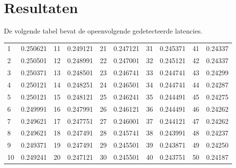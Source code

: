 \section*{Resultaten}
De volgende tabel bevat de opeenvolgende gedetecteerde latencies.
\begin{table}[h!]
	\centering
	\begin{tabular}{l l|l l|l l|l l|l l}
		1 & 0.250621 & 11 & 0.249121 & 21 & 0.247121 & 31 & 0.245371 & 41 & 0.24337 \\
		2 & 0.250501 & 12 & 0.248991 & 22 & 0.247001 & 32 & 0.245121 & 42 & 0.24337 \\
		3 & 0.250371 & 13 & 0.248501 & 23 & 0.246741 & 33 & 0.244741 & 43 & 0.24299 \\
		4 & 0.250121 & 14 & 0.248251 & 24 & 0.246501 & 34 & 0.244741 & 44 & 0.24287 \\
		5 & 0.250121 & 15 & 0.248121 & 25 & 0.246241 & 35 & 0.244491 & 45 & 0.24275 \\
		6 & 0.249991 & 16 & 0.247991 & 26 & 0.246121 & 36 & 0.244491 & 46 & 0.24262 \\
		7 & 0.249621 & 17 & 0.247751 & 27 & 0.246001 & 37 & 0.244121 & 47 & 0.24262 \\
		8 & 0.249621 & 18 & 0.247491 & 28 & 0.245741 & 38 & 0.243991 & 48 & 0.24237 \\
		9 & 0.249371 & 19 & 0.247491 & 29 & 0.245501 & 39 & 0.243871 & 49 & 0.24250 \\
		10 & 0.249241 & 20 & 0.247121 & 30 & 0.245501 & 40 & 0.243751 & 50 & 0.24187 \\
	\end{tabular}
\end{table}
